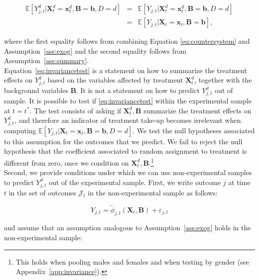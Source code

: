 \begin{eqnarray}
\mathbb{E} \left[ Y_{j,t}^d | \bm{X}_{t}^d  = \bm{x}_{t}^d, \bm{B} = \bm{b}, D = d \right] &=&  \mathbb{E} \left[ Y_{j,t} | \bm{X}_{t}^d  = \bm{x}_{t}^d, \bm{B} = \bm{b}, D = d \right] \\ \nonumber
&=&\mathbb{E} \left[ Y_{j,t} | \bm{X}_{t}  = \bm{x}_{t}, \bm{B} =  \bm{b} \right], \label{eq:invariancetest}
\end{eqnarray}

\noindent where the first equality follows from combining Equation \eqref{eq:countersystem} and Assumption~\ref{ass:exog} and the second equality follows from  Assumption~\ref{ass:summary}.\\

\noindent Equation~\ref{eq:invariancetest} is a statement on how to summarize the treatment effects on $Y_{j,t}^d$ based on the variables affected by treatment $\bm{X}_{t}^d$, together with the background variables $\bm{B}$. It is not a statement on how to predict $Y_{j,t}^d$ out of sample. It is possible to test if \eqref{eq:invariancetest} within the experimental sample at $t = t^*$. The test consists of asking if $\bm{X}_{t}^d, \bm{B}$ summarize the treatment effects on  $Y_{j,t}^d$, and therefore an indicator of treatment take-up becomes irrelevant when computing $\mathbb{E} \left[ Y_{j,t} | \bm{X}_{t}  = \bm{x}_{t}, \bm{B} =  \bm{b}, D = d \right]$. We test the null hypotheses associated to this assumption for the outcomes that we predict. We fail to reject the null  hypothesis that the coefficient associated to random assignment to treatment is different from zero, once we condition on $\bm{X}_{t}^d, \bm{B}$.\footnote{This holds when pooling males and females and when testing by gender (see Appendix~\ref{app:invariance}).}\\

\noindent Second, we provide conditions under which we can use non-experimental samples to predict $Y_{j,t}^d$ out of the experimental sample. First, we write outcome $j$ at time $t$ in the set of outcomes $\mathcal{J}_{t}$ in the non-experimental sample as follows: 

\begin{equation}
Y_{j,t} = \widetilde{\phi}_{j,t} \left( \bm{X}_{t}, \bm{B} \right) + \varepsilon_{j,t} \label{eq:outcomenonexp}
\end{equation} 

\noindent and assume that an assumption analogous to Assumption~\ref{ass:exog} holds in the non-experimental sample:

